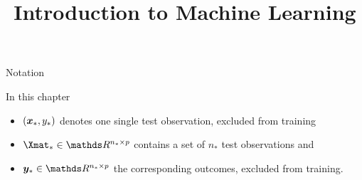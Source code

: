




\newcommand{\titlefigure}{figure_man/post-mean.png} %
\newcommand{\learninggoals}{
  \item \textcolor{blue}{XXX}
  \item \textcolor{blue}{XXX}
}

\title{Introduction to Machine Learning}
\date{}





\begin{vbframe}{Notation}
% 
% 
% 
% 
% 

In this chapter 

\begin{itemize}
\item $(\bm{x}_*, y_*)$ denotes one single test observation, excluded from training
\item $\Xmat_* \in \R^{n_* \times p}$ contains a set of $n_*$ test observations and  
\item $\yv_* \in \R^{n_* \times p}$ the corresponding outcomes, excluded from training. 
\end{itemize}





\end{vbframe}
